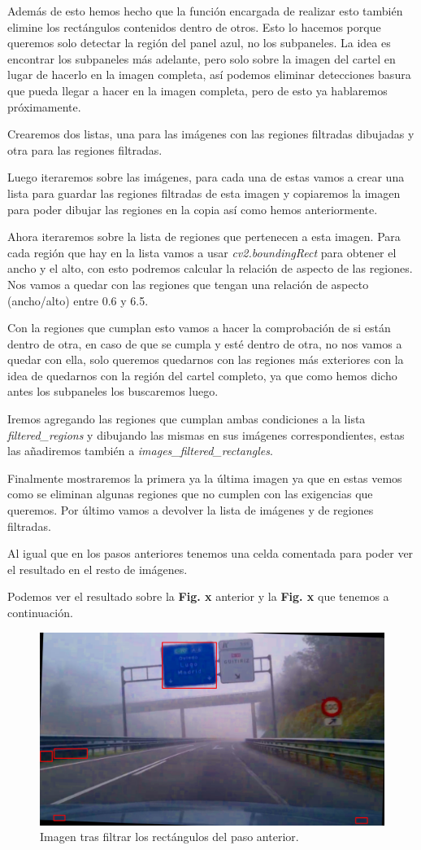 \documentclass[a4paper, 12pt]{article}
\begin{document}
Además de esto hemos hecho que la función encargada de realizar esto también elimine los rectángulos contenidos dentro de otros. Esto lo hacemos porque queremos solo detectar la región del panel azul, no los subpaneles. La idea es encontrar los subpaneles más adelante, pero solo sobre la imagen del cartel en lugar de hacerlo en la imagen completa, así podemos eliminar detecciones basura que pueda llegar a hacer en la imagen completa, pero de esto ya hablaremos próximamente.


Crearemos dos listas, una para las imágenes con las regiones filtradas dibujadas y otra para las regiones filtradas. 


Luego iteraremos sobre las imágenes, para cada una de estas vamos a crear una lista para guardar las regiones filtradas de esta imagen y copiaremos la imagen para poder dibujar las regiones en la copia así como hemos anteriormente. 


Ahora iteraremos sobre la lista de regiones que pertenecen a esta imagen. Para cada región que hay en la lista vamos a usar \textit{cv2.boundingRect} para obtener el ancho y el alto, con esto podremos calcular la relación de aspecto de las regiones. Nos vamos a quedar con las regiones que tengan una relación de aspecto (ancho/alto) entre 0.6 y 6.5. 


Con la regiones que cumplan esto vamos a hacer la comprobación de si están dentro de otra, en caso de que se cumpla y esté dentro de otra, no nos vamos a quedar con ella, solo queremos quedarnos con las regiones más exteriores con la idea de quedarnos con la región del cartel completo, ya que como hemos dicho antes los subpaneles los buscaremos luego.

Iremos agregando las regiones que cumplan ambas condiciones a la lista \textit{filtered\_regions} y dibujando las mismas en sus imágenes correspondientes, estas las añadiremos también a \textit{images\_filtered\_rectangles}.

Finalmente mostraremos la primera ya la última imagen ya que en estas vemos como se eliminan algunas regiones que no cumplen con las exigencias que queremos. Por último vamos a devolver la lista de imágenes y de regiones filtradas.

Al igual que en los pasos anteriores tenemos una celda comentada para poder ver el resultado en el resto de imágenes. 

Podemos ver el resultado sobre la \textbf{Fig. x} anterior y la \textbf{Fig. x} que tenemos a continuación.
\begin{figure}[h]
	\centering
	\includegraphics[width=0.6\linewidth]{img/RectangulosFiltrados}
	\caption{Imagen tras filtrar los rectángulos del paso anterior.}
	\label{fig:RectangulosFiltrados}
\end{figure}
\end{document}
